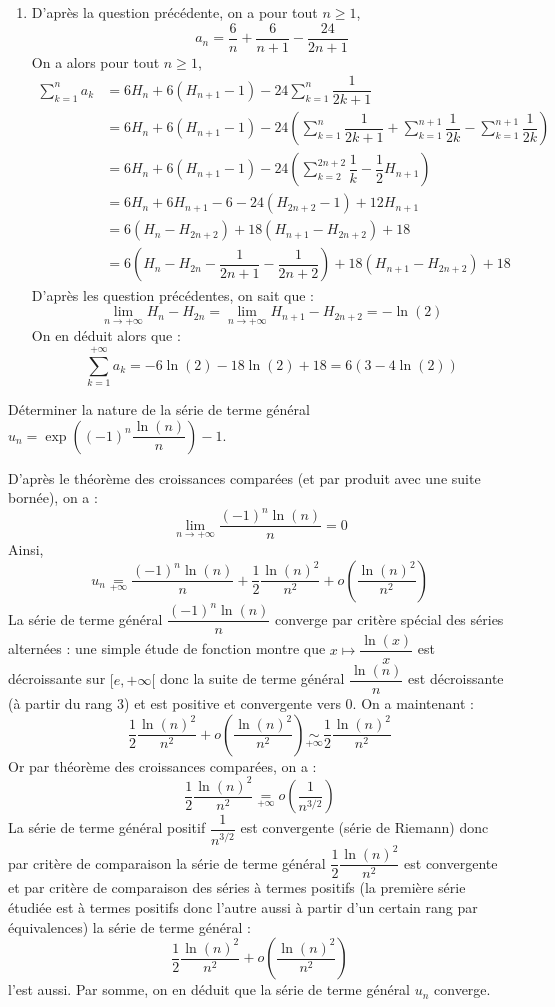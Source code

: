 \documentclass[a4paper,10pt]{report}
\begin{document}
\begin{enumerate}
\item D'après la question précédente, on a pour tout $n \geq 1$,
$$ a_n = \dfrac{6}{n} + \dfrac{6}{n+1} - \dfrac{24}{2n+1}$$
On a alors pour tout $n \geq 1$,
\begin{align*}
\sum_{k=1}^n a_k & = 6 H_n + 6(H_{n+1}-1)- 24 \sum_{k=1}^n \dfrac{1}{2k+1} \\
& = 6 H_n + 6(H_{n+1}-1)- 24 \left( \sum_{k=1}^n \dfrac{1}{2k+1} +  \sum_{k=1}^{n+1} \dfrac{1}{2k} - \sum_{k=1}^{n+1} \dfrac{1}{2k} \right) \\
& =6 H_n + 6(H_{n+1}-1)-24 \left( \sum_{k=2}^{2n+2} \dfrac{1}{k} -  \dfrac{1}{2} H_{n+1} \right) \\
& = 6H_n + 6 H_{n+1} - 6 - 24 (H_{2n+2}-1) + 12 H_{n+1} \\
& = 6(H_n - H_{2n+2}) + 18(H_{n+1}- H_{2n+2}) + 18 \\
& = 6 \left( H_n - H_{2n} - \dfrac{1}{2n+1} - \dfrac{1}{2n+2} \right) + 18 (H_{n+1}- H_{2n+2})  + 18
\end{align*}
D'après les question précédentes, on sait que :
$$ \lim_{n \rightarrow + \infty} H_n- H_{2n} = \lim_{n \rightarrow + \infty} H_{n+1}- H_{2n+2} = - \ln(2)$$
On en déduit alors que :
$$ \sum_{k=1}^{+ \infty} a_k = -6\ln(2) -18 \ln(2) + 18 = 6(3- 4 \ln(2))$$
\end{enumerate}

\begin{Exa} Déterminer la nature de la série de terme général $u_n = \exp \left( (-1)^n \dfrac{\ln(n)}{n} \right)-1$.
\end{Exa}

\corr D'après le théorème des croissances comparées (et par produit avec une suite bornée), on a :
$$ \lim_{n \rightarrow + \infty} \dfrac{(-1)^n \ln(n)}{n}=0$$
Ainsi,
$$ u_n \underset{+ \infty}{=}  \dfrac{(-1)^n \ln(n)}{n} + \dfrac{1}{2}  \dfrac{\ln(n)^2}{n^2} + o \left(  \dfrac{\ln(n)^2}{n^2} \right)$$
La série de terme général $\dfrac{(-1)^n \ln(n)}{n}$ converge par critère spécial des séries alternées : une simple étude de fonction montre que $x \mapsto \dfrac{\ln(x)}{x}$ est décroissante sur $[e, + \infty[$ donc la suite de terme général $ \dfrac{\ln(n)}{n}$ est décroissante (à partir du rang $3$) et est positive et convergente vers $0$. On a maintenant :
$$ \dfrac{1}{2}  \dfrac{\ln(n)^2}{n^2} + o \left(  \dfrac{\ln(n)^2}{n^2} \right) \underset{+ \infty}{\sim}  \dfrac{1}{2}  \dfrac{\ln(n)^2}{n^2}$$
Or par théorème des croissances comparées, on a :
$$ \dfrac{1}{2}  \dfrac{\ln(n)^2}{n^2} \underset{+ \infty}{=} o \left( \dfrac{1}{n^{3/2}}\right)$$
La série de terme général positif $\dfrac{1}{n^{3/2}}$ est convergente (série de Riemann) donc par critère de comparaison la série de terme général $\dfrac{1}{2}  \dfrac{\ln(n)^2}{n^2}$ est convergente et par critère de comparaison des séries à termes positifs (la première série étudiée est à termes positifs donc l'autre aussi à partir d'un certain rang par équivalences) la série de terme général :
$$ \dfrac{1}{2}  \dfrac{\ln(n)^2}{n^2} + o \left(  \dfrac{\ln(n)^2}{n^2} \right) $$
l'est aussi. Par somme, on en déduit que la série de terme général $u_n$ converge.
\end{document}
